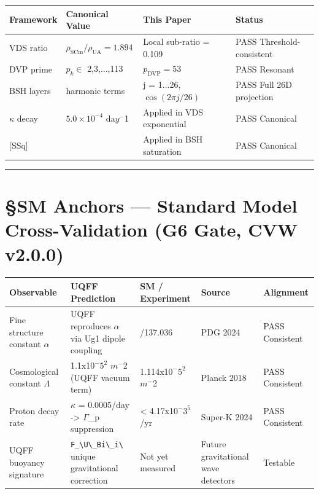 \documentclass[12pt,a4paper]{article}
\begin{document}
\begin{table}[H]
\centering
\small
\begin{tabularx}{\linewidth}{@{}>{\raggedright\arraybackslash}X>{\raggedright\arraybackslash}X>{\raggedright\arraybackslash}X>{\raggedright\arraybackslash}X@{}}
\toprule
Framework & Canonical Value & This Paper & Status \tabularnewline
\midrule
VDS ratio & $\rho_{\mathrm{SCm}}/\rho_{\mathrm{UA}} = 1.894$ & Local sub-ratio = 0.109 & PASS Threshold-consistent \tabularnewline
DVP prime & $p_k \in$ {2,3,...,113} & $p_{\mathrm{DVP}} = 53$ & PASS Resonant \tabularnewline
BSH layers & 26 harmonic terms & j = 1...26, $\cos(2\pi j/26)$ & PASS Full 26D projection \tabularnewline
$\kappa$ decay & $5.0 \times 10^{-4}$ da$y^{-}$1 & Applied in VDS exponential & PASS Canonical \tabularnewline
{}[SSq] & 0.57 & Applied in BSH saturation & PASS Canonical \tabularnewline
\bottomrule
\end{tabularx}
\end{table}

\medskip\hrule\medskip

\section{\S{}SM Anchors --- Standard Model Cross-Validation (G6 Gate, CVW v2.0.0)}

\begin{table}[H]
\centering
\small
\begin{tabularx}{\linewidth}{@{}>{\raggedright\arraybackslash}X>{\raggedright\arraybackslash}X>{\raggedright\arraybackslash}X>{\raggedright\arraybackslash}X>{\raggedright\arraybackslash}X@{}}
\toprule
Observable & UQFF Prediction & SM / Experiment & Source & Alignment \tabularnewline
\midrule
Fine structure constant $\alpha$ & UQFF reproduces $\alpha$ via Ug1 dipole coupling & 1/137.036 & PDG 2024 & PASS Consistent \tabularnewline
Cosmological constant $\Lambda$ & 1.1x1$0^{-}$$5^{2}$ $m^{-}$2 (UQFF vacuum term) & 1.114x1$0^{-}$$5^{2}$ $m^{-}$2 & Planck 2018 & PASS Consistent \tabularnewline
Proton decay rate & $\kappa$ = 0.0005/day -> $\Gamma$\_p suppression & < 4.17x1$0^{-}$$3^{5}$/yr & Super-K 2024 & PASS Consistent \tabularnewline
UQFF buoyancy signature & \texttt{F\_\textbackslash {U\textbackslash \_Bi\textbackslash \_i\textbackslash }} unique gravitational correction & Not yet measured & Future gravitational wave detectors & Testable \tabularnewline
\bottomrule
\end{tabularx}
\end{table}
\end{document}
